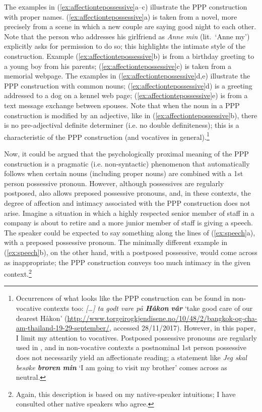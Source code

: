 \documentclass[output=paper]{langsci/langscibook}
\begin{document}
\noindent The examples in (\ref{ex:affectiontepossessive}a--c) illustrate the
PPP construction with proper names.   (\ref{ex:affectiontepossessive}a) is
taken from a novel, more precisely from a scene in which a new couple are
saying good night to each other. Note that the person who addresses his
girlfriend as \emph{Anne min} (lit.\ `Anne my') explicitly  asks for permission
to do so; this highlights the intimate style  of the construction. Example
(\ref{ex:affectiontepossessive}b) is from a birthday greeting to a young boy
from his  parents;   (\ref{ex:affectiontepossessive}c) is taken from a memorial
webpage. The examples in (\ref{ex:affectiontepossessive}d,e) illustrate the
PPP construction with common nouns;  (\ref{ex:affectiontepossessive}d) is a
greeting addressed to a dog on a kennel web page;
(\ref{ex:affectiontepossessive}e) is from a text message exchange between
spouses. Note that when  the noun in a PPP construction is modified by an
adjective, like in (\ref{ex:affectiontepossessive}b), there is no
pre-adjectival definite determiner (i.e. no double definiteness); this is a
characteristic of the PPP construction (and vocatives in
general).\footnote{Occurrences of what looks like the PPP construction can be
    found in non-vocative contexts too: \emph{[\dots{}] ta godt vare på
    \textbf{Håkon} \textbf{vår}} `take good care of our dearest Håkon'
    (\url{http://www.torgeirogkjendisene.no/10/48/2/bangkok-og-cha-am-thailand-19-29-september/},
    accessed 28/11/2017). However, in this paper, I limit my attention to
    vocatives. Postposed possessive pronouns are regularly used in ,
    and in non-vocative contexts a postnominal 1st person possessive does not
    necessarily yield an affectionate reading; a statement like \emph{Jeg skal
besøke \textbf{broren} \textbf{min} } `I am going to visit my brother' comes
across as neutral. }

Now,  it could  be argued that  the psychologically proximal meaning of the PPP
construction is a pragmatic (i.e. non-syntactic) phenomenon that automatically
follows when certain nouns (including proper nouns) are  combined with a 1st
person  possessive pronoun. However, although possessives are regularly
postposed,  also allows preposed possessive pronouns, and, in
these contexts, the degree of affection and intimacy associated with the PPP
construction does not  arise. Imagine a situation in which a highly respected
senior member of staff in a company is about to retire and a more junior
member of staff is giving a  speech. The speaker could be expected to say
something along the lines of (\ref{ex:speech}a), with a preposed possessive
pronoun. The minimally different example in (\ref{ex:speech}b), on the other
hand, with a postposed possessive, would come across as inappropriate; the PPP
construction conveys too much intimacy in the given context.\footnote{Again,
this description is based on my native-speaker intuitions; I have consulted
other native speakers who agree.}
\end{document}
